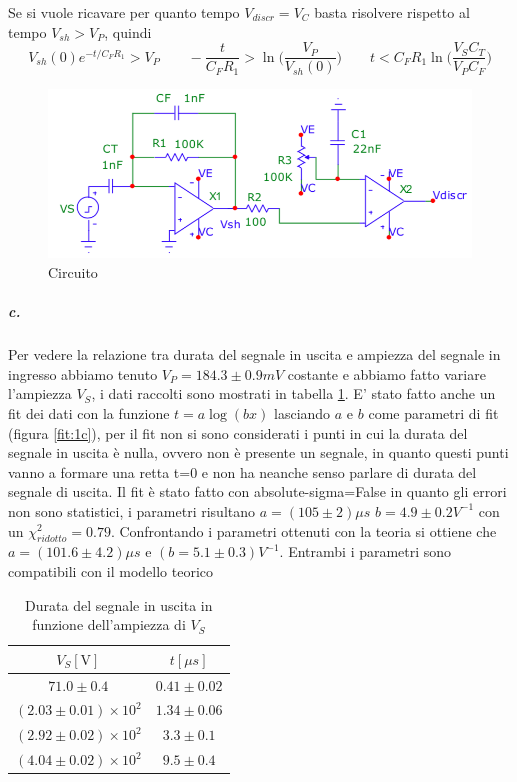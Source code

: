 \documentclass{article}
\newcommand{\vz}{V_{sh}(0)}
\begin{document}
		Se si vuole ricavare per quanto tempo $V_{discr}=V_C$ basta risolvere rispetto al tempo $V_{sh}>V_P$, quindi
		\begin{equation}
			\vz e^{-t/C_FR_1}>V_P\qquad-\frac{t}{C_FR_1}>\ln \bigg(\frac{V_P}{\vz }\bigg)\qquad t<C_FR_1\ln \bigg(\frac{V_SC_T}{V_PC_F}\bigg)
		\end{equation}
		\begin{figure}
			\centering
			\includegraphics[width=120mm]{immagini/circa.png}
			\caption{Circuito}
			\label{fig:circ}
		\end{figure}

	
	\subparagraph{c.}
		Per vedere la relazione tra durata del segnale in uscita e ampiezza del segnale in ingresso abbiamo tenuto $V_P=184.3\pm0.9 mV$ costante e abbiamo fatto variare l'ampiezza $V_S$, i dati raccolti sono mostrati in tabella \ref{tab:durata}. E' stato fatto anche un fit dei dati con la funzione $t=a \log(bx)$ lasciando $a$ e $b$ come parametri di fit (figura \ref{fit:1c}), per il fit non si sono considerati i punti in cui la durata del segnale in uscita è nulla, ovvero non è presente un segnale, in quanto questi punti vanno a formare una retta t=0 e non ha neanche senso parlare di durata del segnale di uscita.\newline
		Il fit  è stato fatto con absolute-sigma=False in quanto gli errori non sono statistici, i parametri risultano $a=(105\pm2)\mu s$ $b=4.9\pm0.2 V^{-1}$ con un $\chi^2_{ridotto}=0.79$. Confrontando i parametri ottenuti con la teoria si ottiene che $a=(101.6\pm4.2)\mu s$ e $(b=5.1\pm0.3)V^{-1}$. Entrambi i parametri sono compatibili con il modello teorico
	
		\begin{table}[h]
			\begin{center}
				\begin{tabular}{cc}
					\hline
					$V_S [\mathrm{V}]$&$t[\mu s]$ \\
					\hline
					$71.0\pm0.4$ & $0.41\pm0.02$ \\
					$(2.03\pm0.01)\times 10^{2}$ & $1.34\pm0.06$ \\
					$(2.92\pm0.02)\times 10^{2}$ & $3.3\pm0.1$ \\
					$(4.04\pm0.02)\times 10^{2}$ & $9.5\pm0.4$ \\
				\end{tabular}
			\end{center}
			\caption{Durata del segnale in uscita in funzione dell'ampiezza di $V_S$}
			\label{tab:durata}
		\end{table}
		
\end{document}
